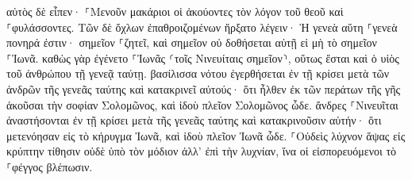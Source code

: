 \documentclass{openreader}
\begin{document}
αὐτὸς δὲ εἶπεν· ⸀Μενοῦν μακάριοι οἱ ἀκούοντες τὸν λόγον τοῦ θεοῦ καὶ ⸀φυλάσσοντες. 
Τῶν δὲ ὄχλων ἐπαθροιζομένων ἤρξατο λέγειν· Ἡ γενεὰ αὕτη ⸀γενεὰ πονηρά ἐστιν· σημεῖον ⸀ζητεῖ, καὶ σημεῖον οὐ δοθήσεται αὐτῇ εἰ μὴ τὸ σημεῖον ⸀Ἰωνᾶ. 
καθὼς γὰρ ἐγένετο ⸀Ἰωνᾶς ⸂τοῖς Νινευίταις σημεῖον⸃, οὕτως ἔσται καὶ ὁ υἱὸς τοῦ ἀνθρώπου τῇ γενεᾷ ταύτῃ. 
βασίλισσα νότου ἐγερθήσεται ἐν τῇ κρίσει μετὰ τῶν ἀνδρῶν τῆς γενεᾶς ταύτης καὶ κατακρινεῖ αὐτούς· ὅτι ἦλθεν ἐκ τῶν περάτων τῆς γῆς ἀκοῦσαι τὴν σοφίαν Σολομῶνος, καὶ ἰδοὺ πλεῖον Σολομῶνος ὧδε. 
ἄνδρες ⸀Νινευῖται ἀναστήσονται ἐν τῇ κρίσει μετὰ τῆς γενεᾶς ταύτης καὶ κατακρινοῦσιν αὐτήν· ὅτι μετενόησαν εἰς τὸ κήρυγμα Ἰωνᾶ, καὶ ἰδοὺ πλεῖον Ἰωνᾶ ὧδε. 
⸀Οὐδεὶς λύχνον ἅψας εἰς κρύπτην τίθησιν οὐδὲ ὑπὸ τὸν μόδιον ἀλλ’ ἐπὶ τὴν λυχνίαν, ἵνα οἱ εἰσπορευόμενοι τὸ ⸀φέγγος βλέπωσιν. 
\end{document}
